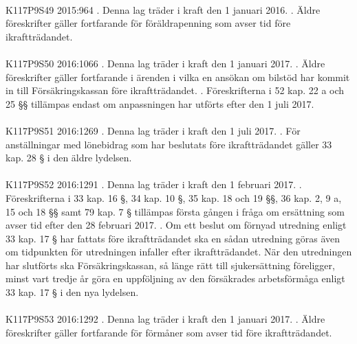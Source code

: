 \documentclass[a4paper,notitlepage,openany,10pt]{book}
\begin{document}
\paragraph*{}
{\tiny K117P9S49}
2015:964
. Denna lag träder i kraft den 1 januari 2016.
. Äldre föreskrifter gäller fortfarande för föräldrapenning som avser tid före ikraftträdandet.
\paragraph*{}
{\tiny K117P9S50}
2016:1066
. Denna lag träder i kraft den 1 januari 2017.
. Äldre föreskrifter gäller fortfarande i ärenden i vilka en ansökan om bilstöd har kommit in till Försäkringskassan före ikraftträdandet.
. Föreskrifterna i 52 kap. 22 a och 25 §§ tillämpas endast om anpassningen har utförts efter den 1 juli 2017.
\paragraph*{}
{\tiny K117P9S51}
2016:1269
. Denna lag träder i kraft den 1 juli 2017.
. För anställningar med lönebidrag som har beslutats före ikraftträdandet gäller 33 kap. 28 § i den äldre lydelsen.
\paragraph*{}
{\tiny K117P9S52}
2016:1291
. Denna lag träder i kraft den 1 februari 2017.
. Föreskrifterna i 33 kap. 16 §, 34 kap. 10 §, 35 kap. 18 och 19 §§, 36 kap. 2, 9 a, 15 och 18 §§ samt 79 kap. 7 § tillämpas första gången i fråga om ersättning som avser tid efter den 28 februari 2017.
. Om ett beslut om förnyad utredning enligt 33 kap. 17 § har fattats före ikraftträdandet ska en sådan utredning göras även om tidpunkten för utredningen infaller efter ikraftträdandet. När den utredningen har slutförts ska Försäkringskassan, så länge rätt till sjukersättning föreligger, minst vart tredje år göra en uppföljning av den försäkrades arbetsförmåga enligt 33 kap. 17 § i den nya lydelsen.
\paragraph*{}
{\tiny K117P9S53}
2016:1292
. Denna lag träder i kraft den 1 januari 2017.
. Äldre föreskrifter gäller fortfarande för förmåner som avser tid före ikraftträdandet.
\end{document}
